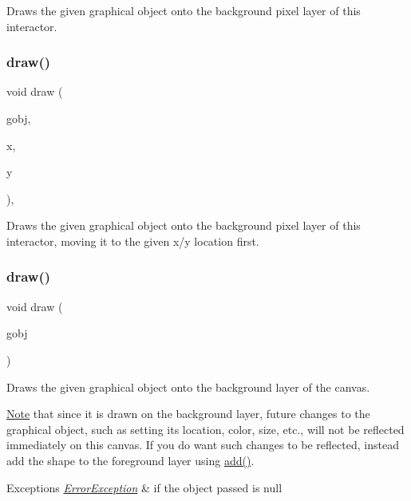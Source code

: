 Draws the given graphical object onto the background pixel layer of this interactor. 

\mbox{\label{classGDrawingSurface_a8af8762bd6720e0a1d2a84b190e3dc96}} 
\subsubsection{\texorpdfstring{draw()}{draw()}\hspace{0.1cm}{\footnotesize\ttfamily [3/4]}}
{\footnotesize\ttfamily void draw (\begin{DoxyParamCaption}\item[{\mbox{\hyperlink{classGObject}{G\+Object}} \&}]{gobj,  }\item[{double}]{x,  }\item[{double}]{y }\end{DoxyParamCaption})\hspace{0.3cm}{\ttfamily [virtual]}, {\ttfamily [inherited]}}



Draws the given graphical object onto the background pixel layer of this interactor, moving it to the given x/y location first. 

\mbox{\label{classGCanvas_a00bf9d87527d59e6f11756589c25e4e7}} 
\subsubsection{\texorpdfstring{draw()}{draw()}\hspace{0.1cm}{\footnotesize\ttfamily [4/4]}}
{\footnotesize\ttfamily void draw (\begin{DoxyParamCaption}\item[{\mbox{\hyperlink{classGObject}{G\+Object}} $\ast$}]{gobj }\end{DoxyParamCaption})\hspace{0.3cm}{\ttfamily [virtual]}}



Draws the given graphical object onto the background layer of the canvas. 

\mbox{\hyperlink{classNote}{Note}} that since it is drawn on the background layer, future changes to the graphical object, such as setting its location, color, size, etc., will not be reflected immediately on this canvas. If you do want such changes to be reflected, instead add the shape to the foreground layer using \mbox{\hyperlink{classGCanvas_afe8277e7b2627513c6f7452fb0b2847d}{add()}}. 
\begin{DoxyExceptions}{Exceptions}
{\em \mbox{\hyperlink{classErrorException}{Error\+Exception}}} & if the object passed is null \\
\hline
\end{DoxyExceptions}


